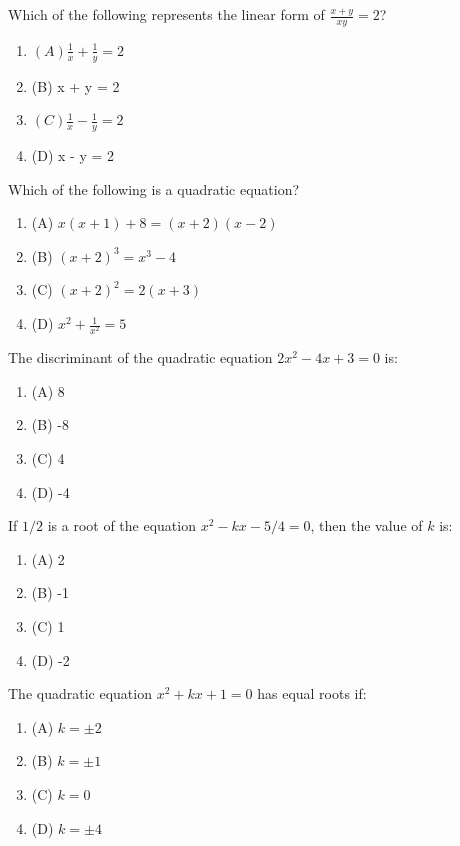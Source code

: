\documentclass[12pt,a4paper]{exam}
\begin{document}
\begin{questions}
\question[1] Which of the following represents the linear form of $\frac{x+y}{xy} = 2$?
\begin{enumerate}[label=(\Alph*)]
  \item $(A) \frac{1}{x} + \frac{1}{y} = 2$
  \item (B) x + y = 2
  \item $(C) \frac{1}{x} - \frac{1}{y} = 2$
  \item (D) x - y = 2
\end{enumerate}
\vspace{0.15cm}

\question[1] Which of the following is a quadratic equation?
\begin{enumerate}[label=(\Alph*)]
  \item (A) $x(x+1) + 8 = (x+2)(x-2)$
  \item (B) $(x+2)^3 = x^3 - 4$
  \item (C) $(x+2)^2 = 2(x+3)$
  \item (D) $x^2 + \frac{1}{x^2} = 5$
\end{enumerate}
\vspace{0.15cm}

\question[1] The discriminant of the quadratic equation $2x^2 - 4x + 3 = 0$ is:
\begin{enumerate}[label=(\Alph*)]
  \item (A) 8
  \item (B) -8
  \item (C) 4
  \item (D) -4
\end{enumerate}
\vspace{0.15cm}

\question[1] If $1/2$ is a root of the equation $x^2 - kx - 5/4 = 0$, then the value of $k$ is:
\begin{enumerate}[label=(\Alph*)]
  \item (A) 2
  \item (B) -1
  \item (C) 1
  \item (D) -2
\end{enumerate}
\vspace{0.15cm}

\question[1] The quadratic equation $x^2 + kx + 1 = 0$ has equal roots if:
\begin{enumerate}[label=(\Alph*)]
  \item (A) $k = \pm 2$
  \item (B) $k = \pm 1$
  \item (C) $k = 0$
  \item (D) $k = \pm 4$
\end{enumerate}
\vspace{0.15cm}


\end{questions}
\end{document}
